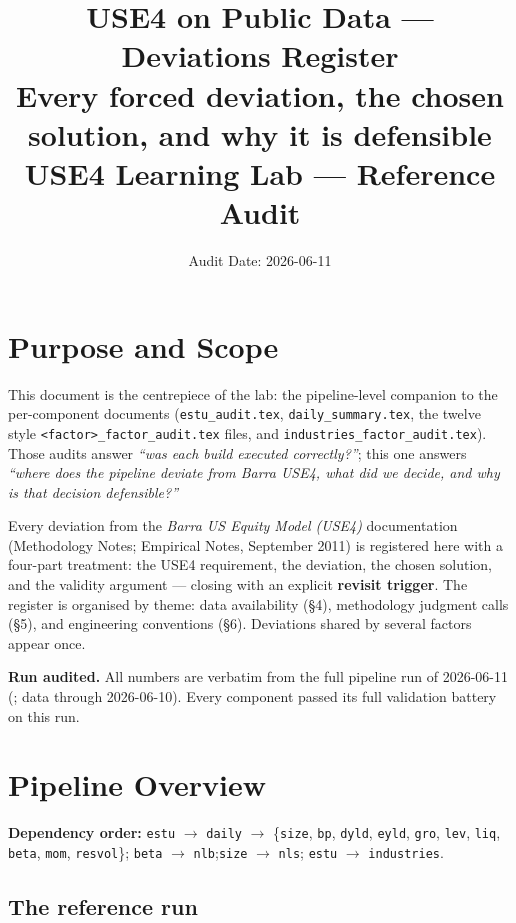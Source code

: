 \documentclass[11pt,a4paper]{article}
\title{\textbf{USE4 on Public Data --- Deviations Register}\\[2pt]
\large Every forced deviation, the chosen solution, and why it is defensible\\[4pt]
\normalsize USE4 Learning Lab --- Reference Audit}
\author{Audit Date: 2026-06-11}
\date{}
\begin{document}
\maketitle
\tableofcontents
\newpage

\section{Purpose and Scope}

This document is the centrepiece of the lab: the pipeline-level companion to the per-component
documents (\texttt{estu\_audit.tex}, \texttt{daily\_summary.tex}, the
twelve style \texttt{<factor>\_factor\_audit.tex} files, and
\texttt{industries\_factor\_audit.tex}). Those audits answer
\emph{``was each build executed correctly?''}; this one answers
\emph{``where does the pipeline deviate from Barra USE4, what did we decide,
and why is that decision defensible?''}

Every deviation from the \emph{Barra US Equity Model (USE4)} documentation
(Methodology Notes; Empirical Notes, September 2011) is registered here with a
four-part treatment: the USE4 requirement, the deviation, the chosen solution,
and the validity argument --- closing with an explicit \textbf{revisit trigger}.
The register is organised by theme: data availability (\S4), methodology
judgment calls (\S5), and engineering conventions (\S6). Deviations shared by
several factors appear once.

\smallskip
\textbf{Run audited.} All numbers are verbatim from the full pipeline run of
2026-06-11 (; data through 2026-06-10).
Every component passed its full validation battery on this run.

\section{Pipeline Overview}

\textbf{Dependency order:}\quad
\texttt{estu} $\to$ \texttt{daily} $\to$
\{\texttt{size}, \texttt{bp}, \texttt{dyld}, \texttt{eyld}, \texttt{gro},
\texttt{lev}, \texttt{liq}, \texttt{beta}, \texttt{mom}, \texttt{resvol}\};\quad
\texttt{beta} $\to$ \texttt{nlb};\quad \texttt{size} $\to$ \texttt{nls};\quad
\texttt{estu} $\to$ \texttt{industries}.

\subsection{The reference run}
\end{document}
